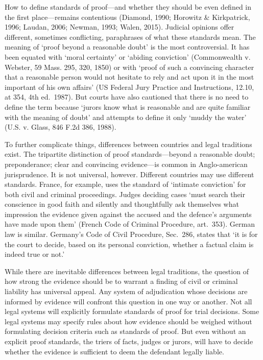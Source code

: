 \documentclass[10pt,dvipsnames,enabledeprecatedfontcommands]{scrartcl}
\begin{document}
How to define standards of proof---and whether they should be even
defined in the first place---remains contentious (Diamond, 1990;
Horowitz \& Kirkpatrick, 1996; Laudan, 2006; Newman, 1993; Walen, 2015).
Judicial opinions offer different, sometimes conflicting, paraphrases of
what these standards mean. The meaning of `proof beyond a reasonable
doubt' is the most controversial. It has been equated with `moral
certainty' or `abiding conviction' (Commonwealth v. Webster, 59 Mass.
295, 320, 1850) or with `proof of such a convincing character that a
reasonable person would not hesitate to rely and act upon it in the most
important of his own affairs' (US Federal Jury Practice and
Instructions, 12.10, at 354, 4th ed.~1987). But courts have also
cautioned that there is no need to define the term because `jurors know
what is reasonable and are quite familiar with the meaning of doubt' and
attempts to define it only `muddy the water' (U.S. v. Glass, 846 F.2d
386, 1988).

To further complicate things, differences between countries and legal
traditions exist. The tripartite distinction of proof standards---beyond
a reasonable doubt; preponderance; clear and convincing evidence---is
common in Anglo-american jurisprudence. It is not universal, however.
Different countries may use different standards. France, for example,
uses the standard of `intimate conviction' for both civil and criminal
proceedings. Judges deciding cases `must search their conscience in good
faith and silently and thoughtfully ask themselves what impression the
evidence given against the accused and the defence's arguments have made
upon them' (French Code of Criminal Procedure, art.~353). German law is
similar. Germany's Code of Civil Procedure, Sec.~286, states that `it is
for the court to decide, based on its personal conviction, whether a
factual claim is indeed true or not.'

While there are inevitable differences between legal traditions, the
question of how strong the evidence should be to warrant a finding of
civil or criminal liability has universal appeal. Any system of
adjudication whose decisions are informed by evidence will confront this
question in one way or another. Not all legal systems will explicitly
formulate standards of proof for trial decisions. Some legal systems may
specify rules about how evidence should be weighed without formulating
decision criteria such as standards of proof. But even without an
explicit proof standards, the triers of facts, judges or jurors, will
have to decide whether the evidence is sufficient to deem the defendant
legally liable.
\end{document}
